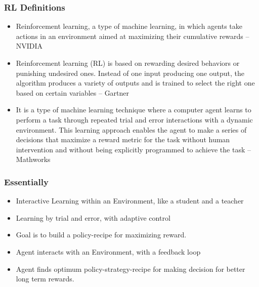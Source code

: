 \begin{frame}[fragile]\frametitle{RL Definitions}
\begin{itemize}
\item Reinforcement learning, a type of machine learning, in which agents take actions in an environment aimed at maximizing their cumulative rewards – NVIDIA

\item Reinforcement learning (RL) is based on rewarding desired behaviors or punishing undesired ones. Instead of one input producing one output, the algorithm produces a variety of outputs and is trained to select the right one based on certain variables – Gartner

\item It is a type of machine learning technique where a computer agent learns to perform a task through repeated trial and error interactions with a dynamic environment. This learning approach enables the agent to make a series of decisions that maximize a reward metric for the task without human intervention and without being explicitly programmed to achieve the task – Mathworks
\end{itemize}
\end{frame}

\begin{frame}[fragile]\frametitle{Essentially}
\begin{itemize}
\item Interactive Learning within an Environment, like a student and a teacher
\item Learning by trial and error, with adaptive control
\item Goal is to build a policy-recipe for maximizing reward.
\item Agent interacts with an Environment, with a feedback loop
\item Agent finds optimum policy-strategy-recipe for making decision for better long term rewards.
\end{itemize}
\end{frame}



